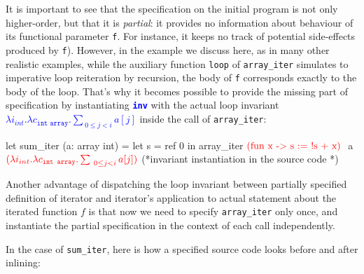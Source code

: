 \documentclass[a4paper,11pt,oneside]{article}
\theoremstyle{plain}
\begin{document}
It is important to see that the specification on the initial program is not only higher-order, but that it is \textit{partial}: it provides no information about behaviour of its functional parameter \texttt{f}. 
	For instance, it keeps no track of potential side-effects produced by \texttt{f}). 
	However, in the example we discuss here, as in many other realistic examples, while the auxiliary function \texttt{loop} of \texttt{array\_iter} simulates to imperative loop reiteration by recursion, the body of \texttt{f} corresponds exactly to the body of the loop. 
	That's why it becomes possible to provide the missing part of specification by instantiating  \textcolor{blue}{\texttt{\textbf{inv}}} with the actual loop invariant \textcolor{blue}{$\lambda i_{int}.\lambda c_{\texttt{int array}}. \sum_{~0\leq j < i} a[j] $} inside the call of \texttt{array\_iter}:
\begin{small}
\begin{whycode} 
 let sum_iter (a: array int) =		 
   let s = ref 0 in 
   array_iter $\textcolor{red}{\text{(fun x -> s := !s + x)}}~$ a $\textcolor{red}{(\lambda i_{int}.\lambda c_{\texttt{int array}}. \sum_{~0\leq j < i} a[j])}$                    
                                   (*invariant instantiation in the source code *)
\end{whycode}
\end{small}

Another advantage of dispatching the loop invariant between partially specified definition of iterator and iterator's application to actual statement about the iterated function $f$ is that now we need to specify \texttt{array\_iter} only once, and instantiate the partial specification in the context of each call independently.

In the case of \texttt{sum\_iter}, here is how a specified source code looks before and after inlining:
\end{document}
